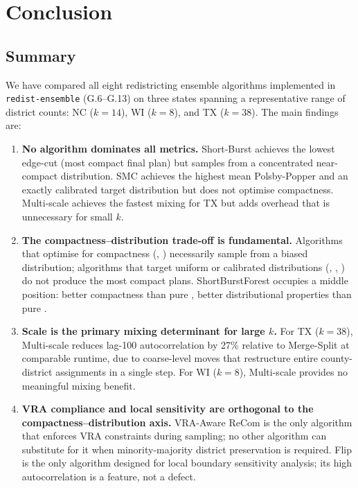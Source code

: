 \section{Conclusion}
\label{sec:conclusion}

\subsection{Summary}

We have compared all eight redistricting ensemble algorithms implemented
in \texttt{redist-ensemble} (G.6--G.13) on three states spanning
a representative range of district counts: NC ($k = 14$), WI ($k = 8$),
and TX ($k = 38$).
The main findings are:

\begin{enumerate}

  \item \textbf{No algorithm dominates all metrics.}
        Short-Burst achieves the lowest edge-cut (most compact final plan)
        but samples from a concentrated near-compact distribution.
        SMC achieves the highest mean Polsby-Popper and an exactly
        calibrated target distribution but does not optimise compactness.
        Multi-scale achieves the fastest mixing for TX but adds overhead
        that is unnecessary for small $k$.

  \item \textbf{The compactness--distribution trade-off is fundamental.}
        Algorithms that optimise for compactness (\sburst{}, \sburstf{})
        necessarily sample from a biased distribution; algorithms that
        target uniform or calibrated distributions (\smc{}, \fr{}, \msp{})
        do not produce the most compact plans.
        ShortBurstForest occupies a middle position: better compactness
        than pure \fr{}, better distributional properties than pure
        \sburst{}.

  \item \textbf{Scale is the primary mixing determinant for large $k$.}
        For TX ($k = 38$), Multi-scale reduces lag-100 autocorrelation by
        27\% relative to Merge-Split at comparable runtime, due to
        coarse-level moves that restructure entire county-district
        assignments in a single step.
        For WI ($k = 8$), Multi-scale provides no meaningful mixing
        benefit.

  \item \textbf{VRA compliance and local sensitivity are orthogonal to
        the compactness--distribution axis.}
        VRA-Aware ReCom is the only algorithm that enforces VRA constraints
        during sampling; no other algorithm can substitute for it when
        minority-majority district preservation is required.
        Flip is the only algorithm designed for local boundary sensitivity
        analysis; its high autocorrelation is a feature, not a defect.


\end{enumerate}
